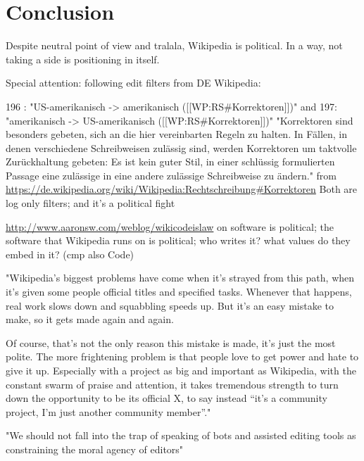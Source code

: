 %
\chapter{Conclusion}
\label{chap:conclusion}

Despite neutral point of view and tralala, Wikipedia is political.
In a way, not taking a side is positioning in itself.

Special attention: following edit filters from DE Wikipedia:

196 : "US-amerikanisch -> amerikanisch ([[WP:RS\#Korrektoren]])"
and 197: "amerikanisch -> US-amerikanisch ([[WP:RS\#Korrektoren]])"
"Korrektoren sind besonders gebeten, sich an die hier vereinbarten Regeln zu halten. In Fällen, in denen verschiedene Schreibweisen zulässig sind, werden Korrektoren um taktvolle Zurückhaltung gebeten: Es ist kein guter Stil, in einer schlüssig formulierten Passage eine zulässige in eine andere zulässige Schreibweise zu ändern." from \url{https://de.wikipedia.org/wiki/Wikipedia:Rechtschreibung#Korrektoren}
Both are log only filters;
and it's a political fight

\url{http://www.aaronsw.com/weblog/wikicodeislaw}
on software is political; the software that Wikipedia runs on is political; who writes it? what values do they embed in it? (cmp also Code)

"Wikipedia’s biggest problems have come when it’s strayed from this path, when it’s given some people official titles and specified tasks. Whenever that happens, real work slows down and squabbling speeds up. But it’s an easy mistake to make, so it gets made again and again.

Of course, that’s not the only reason this mistake is made, it’s just the most polite. The more frightening problem is that people love to get power and hate to give it up. Especially with a project as big and important as Wikipedia, with the constant swarm of praise and attention, it takes tremendous strength to turn down the opportunity to be its official X, to say instead “it’s a community project, I’m just another community member”."

\cite{GeiRib2010}
"We should not fall into the trap of speaking of bots and
assisted editing tools as constraining the moral agency of
editors"

